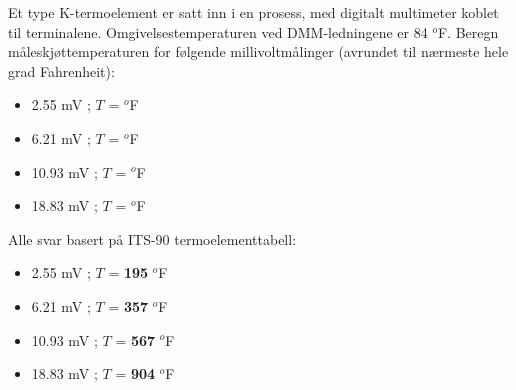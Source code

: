 
Et type K-termoelement er satt inn i en prosess, med digitalt multimeter koblet til terminalene. Omgivelsestemperaturen ved DMM-ledningene er 84 $^{o}$F. Beregn måleskjøttemperaturen for følgende millivoltmålinger (avrundet til nærmeste hele grad Fahrenheit):

\begin{itemize}
\item{} 2.55 mV ; $T$ = \underbar{\hskip 50pt} $^{o}$F
\vskip 10pt
\item{} 6.21 mV ; $T$ = \underbar{\hskip 50pt} $^{o}$F
\vskip 10pt
\item{} 10.93 mV ; $T$ = \underbar{\hskip 50pt} $^{o}$F
\vskip 10pt
\item{} 18.83 mV ; $T$ = \underbar{\hskip 50pt} $^{o}$F
\end{itemize}







Alle svar basert på ITS-90 termoelementtabell:

\begin{itemize}
\item{} 2.55 mV ; $T$ = {\bf 195} $^{o}$F
\vskip 10pt
\item{} 6.21 mV ; $T$ = {\bf 357} $^{o}$F
\vskip 10pt
\item{} 10.93 mV ; $T$ = {\bf 567} $^{o}$F
\vskip 10pt
\item{} 18.83 mV ; $T$ = {\bf 904} $^{o}$F
\end{itemize}









